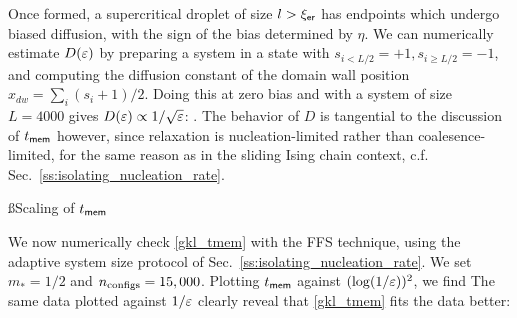 \documentclass[12pt]{article}
\newcommand{\ler}{\ell_{\sf er}}
\newcommand{\tmem}{t_{\sf mem}}
\renewcommand{\ler}{{\xi_{\sf er}}}
\begin{document}
Once formed, a supercritical droplet of size $l > \ler$ has endpoints which undergo biased diffusion, with the sign of the bias determined by $\eta$. We can numerically estimate $D(\varepsilon)$ by preparing a system in a state with $s_{i<L/2} = +1, s_{i\geq L/2} = -1$, and computing the diffusion constant of the domain wall position $x_{dw} = \sum_i (s_i + 1)/2$. Doing this at zero bias and with a system of size $L=4000$ gives $D(\varepsilon) \propto 1/\sqrt{\varepsilon}$:  
\be {}.\ee 
The behavior of $D$ is tangential to the discussion of $\tmem$ however, since relaxation is nucleation-limited rather than coalesence-limited, for the same reason as in the sliding Ising chain context, c.f. Sec.~\ref{ss:isolating_nucleation_rate}. 

\ss{Scaling of $\tmem$} 

We now numerically check \eqref{gkl_tmem} with the FFS technique, using the adaptive system size protocol of Sec.~\ref{ss:isolating_nucleation_rate}. We set $m_*=1/2$ and $n_{\rm configs} = 15,000$. 
Plotting $\tmem$ against $(\log(1/\varepsilon))^2$, we find 
\be {} \ee 
The same data plotted against $1/\varepsilon$ clearly reveal that \eqref{gkl_tmem} fits the data better: 
\be {} \ee 



\end{document}
